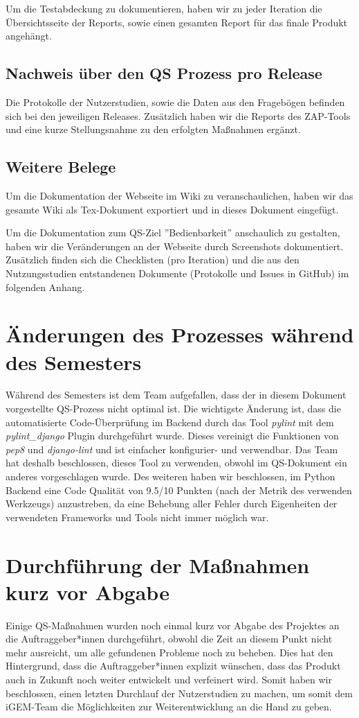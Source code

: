 \documentclass[accentcolor=tud0b,12pt,paper=a4]{tudreport}
\begin{document}
Um die Testabdeckung zu dokumentieren, haben wir zu jeder Iteration die Übersichtsseite der Reports, sowie einen gesamten Report für das finale Produkt angehängt.

\subsection{Nachweis über den QS Prozess pro Release}
Die Protokolle der Nutzerstudien, sowie die Daten aus den Fragebögen befinden sich bei den jeweiligen Releases. Zusätzlich haben wir die Reports des ZAP-Tools und eine kurze Stellungsnahme zu den erfolgten Maßnahmen ergänzt.

\subsection{Weitere Belege}
Um die Dokumentation der Webseite im Wiki zu veranschaulichen, haben wir das gesamte Wiki als Tex-Dokument exportiert und in dieses Dokument eingefügt.

Um die Dokumentation zum QS-Ziel ''Bedienbarkeit'' anschaulich zu gestalten, haben wir die Veränderungen an der Webseite durch Screenshots dokumentiert. Zusätzlich finden sich die Checklisten (pro Iteration) und die aus den Nutzungsstudien entstandenen Dokumente (Protokolle und Issues in GitHub) im folgenden Anhang.

\section{Änderungen des Prozesses während des Semesters}
Während des Semesters ist dem Team aufgefallen, dass der in diesem Dokument vorgestellte QS-Prozess nicht optimal ist. Die wichtigste Änderung ist, dass die automatisierte Code-Überprüfung im Backend durch das Tool \emph{pylint} mit dem \emph{pylint\_django} Plugin durchgeführt wurde. Dieses vereinigt die Funktionen von \emph{pep8} und \emph{django-lint} und ist einfacher konfigurier- und verwendbar. Das Team hat deshalb beschlossen, dieses Tool zu verwenden, obwohl im QS-Dokument ein anderes vorgeschlagen wurde. Des weiteren haben wir beschlossen, im Python Backend eine Code Qualität von 9.5/10 Punkten (nach der Metrik des verwenden Werkzeugs) anzustreben, da eine Behebung aller Fehler durch Eigenheiten der verwendeten Frameworks und Tools nicht immer möglich war.

\section{Durchführung der Maßnahmen kurz vor Abgabe}
Einige QS-Maßnahmen wurden noch einmal kurz vor Abgabe des Projektes an die Auftraggeber*innen durchgeführt, obwohl die Zeit an diesem Punkt nicht mehr ausreicht, um alle gefundenen Probleme noch zu beheben. Dies hat den Hintergrund, dass die Auftraggeber*innen explizit wünschen, dass das Produkt auch in Zukunft noch weiter entwickelt und verfeinert wird. Somit haben wir beschlossen, einen letzten Durchlauf der Nutzerstudien zu machen, um somit dem iGEM-Team die Möglichkeiten zur Weiterentwicklung an die Hand zu geben.
\end{document}
